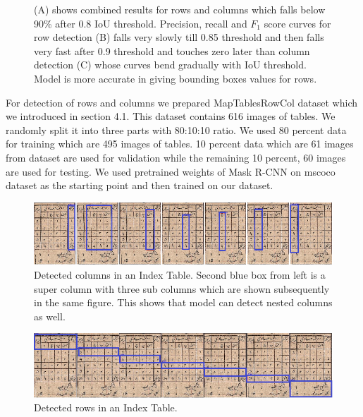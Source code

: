 \begin{figure}[h!]
\begin{subfigure}{0.325\linewidth}
    \caption{}
    \label{}
\end{subfigure}
\caption{(A) shows combined results for rows and columns which falls below 90\% after 0.8 IoU threshold. Precision, recall and $F_1$ score curves for row detection (B) falls very slowly till 0.85 threshold and then falls very fast after 0.9 threshold and touches zero later than column detection (C) whose curves bend gradually with IoU threshold. Model is more accurate in giving bounding boxes values for rows.}
\label{fig:rowCol_graph}
\end{figure}
For detection of rows and columns we prepared MapTablesRowCol dataset which we introduced in section 4.1. This dataset contains 616 images of tables. We randomly split it into three parts with 80:10:10 ratio. We used 80 percent data for training which are 495 images of tables. 10 percent data which are 61 images from dataset are used for validation while the remaining 10 percent, 60 images are used for testing. We used pretrained weights of Mask R-CNN on mscoco dataset as the starting point and then trained on our dataset.
\begin{figure}[h!]
  \includegraphics[width=\linewidth]{column_index_144_edited.png}
  \caption{Detected columns in an Index Table. Second blue box from left is a super column with three sub columns which are shown subsequently in the same figure. This shows that model can detect nested columns as well.}
  \label{fig:colindex}
\end{figure}
\begin{figure}[h!]
  \includegraphics[width=\linewidth]{rows_index_144_edited.png}
  \caption{Detected rows in an Index Table.}
  \label{fig:rowindex}
\end{figure}

